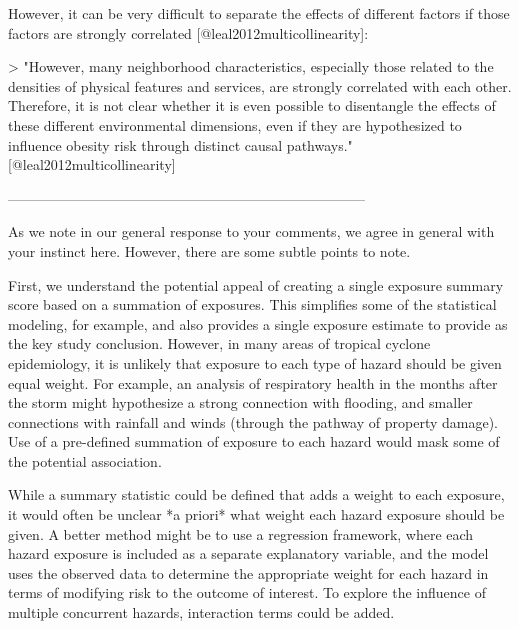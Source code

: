 However, it can be very difficult to separate the effects of different factors
if those factors are strongly correlated [@leal2012multicollinearity]: 

> "However, many neighborhood characteristics, especially those related to the
densities of physical features and services, are strongly correlated with each
other. Therefore, it is not clear whether it is even possible to disentangle the
effects of these different environmental dimensions, even if they are
hypothesized to influence obesity risk through distinct causal pathways."
[@leal2012multicollinearity]

-----------------------------------------------------------------------------

As we note in our general response to your comments, we agree in general with
your instinct here. However, there are some subtle points to note.

First, we understand the potential appeal of creating a single exposure summary
score based on a summation of exposures. This simplifies some of the statistical
modeling, for example, and also provides a single exposure estimate to provide
as the key study conclusion. However, in many areas of tropical cyclone
epidemiology, it is unlikely that exposure to each type of hazard should be
given equal weight. For example, an analysis of respiratory health in the months
after the storm might hypothesize a strong connection with flooding, and smaller
connections with rainfall and winds (through the pathway of property damage).
Use of a pre-defined summation of exposure to each hazard would mask some of the
potential association.

While a summary statistic could be defined that adds a weight to each exposure,
it would often be unclear *a priori* what weight each hazard exposure should be
given. A better method might be to use a regression framework, where each hazard
exposure is included as a separate explanatory variable, and the model uses the
observed data to determine the appropriate weight for each hazard in terms of
modifying risk to the outcome of interest. To explore the influence of multiple
concurrent hazards, interaction terms could be added.

